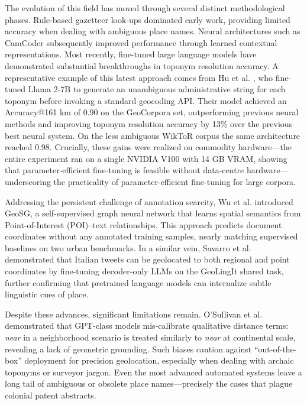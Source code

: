 The evolution of this field has moved through several distinct
methodological phases. Rule-based gazetteer look-ups dominated early
work, providing limited accuracy when dealing with ambiguous place
names. Neural architectures such as CamCoder \citep{Gritta2018_camcoder}
subsequently improved performance through learned contextual
representations. Most recently, fine-tuned large language models have
demonstrated substantial breakthroughs in toponym resolution accuracy. A
representative example of this latest approach comes from Hu et al.
\citep{Hu2024_toponym_llm}, who fine-tuned Llama 2-7B to generate an
unambiguous administrative string for each toponym before invoking a
standard geocoding API. Their model achieved an Accuracy@161 km of 0.90
on the GeoCorpora set, outperforming previous neural methods and
improving toponym resolution accuracy by 13\% over the previous best
neural system. On the less ambiguous WikToR corpus the same architecture
reached 0.98. Crucially, these gains were realized on commodity
hardware---the entire experiment ran on a single NVIDIA V100 with 14 GB
VRAM, showing that parameter‑efficient fine‑tuning is feasible without
data‑centre hardware---underscoring the practicality of
parameter-efficient fine-tuning for large corpora.

Addressing the persistent challenge of annotation scarcity, Wu et al.
\citep{wu2025geosg} introduced GeoSG, a self-supervised graph neural
network that learns spatial semantics from Point-of-Interest (POI)--text
relationships. This approach predicts document coordinates without any
annotated training samples, nearly matching supervised baselines on two
urban benchmarks. In a similar vein, Savarro et al.
\citep{savarro2024geolingit} demonstrated that Italian tweets can be
geolocated to both regional and point coordinates by fine-tuning
decoder-only LLMs on the GeoLingIt shared task, further confirming that
pretrained language models can internalize subtle linguistic cues of
place.

Despite these advances, significant limitations remain. O'Sullivan et
al. \citep{Osullivan2024_metric} demonstrated that GPT-class models
mis-calibrate qualitative distance terms: \emph{near} in a neighborhood
scenario is treated similarly to \emph{near} at continental scale,
revealing a lack of geometric grounding. Such biases caution against
``out-of-the-box'' deployment for precision geolocation, especially when
dealing with archaic toponyms or surveyor jargon. Even the most advanced
automated systems leave a long tail of ambiguous or obsolete place
names---precisely the cases that plague colonial patent abstracts.


